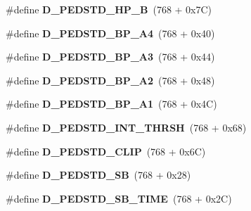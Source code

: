\begin{DoxyCompactItemize}
\item 
\#define {\bfseries D\+\_\+\+P\+E\+D\+S\+T\+D\+\_\+\+H\+P\+\_\+B}~(768 + 0x7\+C)\hypertarget{group___d_r_i_v_e_r_s_ga36c0d5ca76fbb5df31ec8ca0a26db835}{}\label{group___d_r_i_v_e_r_s_ga36c0d5ca76fbb5df31ec8ca0a26db835}

\item 
\#define {\bfseries D\+\_\+\+P\+E\+D\+S\+T\+D\+\_\+\+B\+P\+\_\+\+A4}~(768 + 0x40)\hypertarget{group___d_r_i_v_e_r_s_gac2bece455bcecb189a347b6c0edf2b6f}{}\label{group___d_r_i_v_e_r_s_gac2bece455bcecb189a347b6c0edf2b6f}

\item 
\#define {\bfseries D\+\_\+\+P\+E\+D\+S\+T\+D\+\_\+\+B\+P\+\_\+\+A3}~(768 + 0x44)\hypertarget{group___d_r_i_v_e_r_s_ga41557d8ab6be78f157aa4770d5123235}{}\label{group___d_r_i_v_e_r_s_ga41557d8ab6be78f157aa4770d5123235}

\item 
\#define {\bfseries D\+\_\+\+P\+E\+D\+S\+T\+D\+\_\+\+B\+P\+\_\+\+A2}~(768 + 0x48)\hypertarget{group___d_r_i_v_e_r_s_ga000da9f0c92ec1a103f8e1c50e7e61fd}{}\label{group___d_r_i_v_e_r_s_ga000da9f0c92ec1a103f8e1c50e7e61fd}

\item 
\#define {\bfseries D\+\_\+\+P\+E\+D\+S\+T\+D\+\_\+\+B\+P\+\_\+\+A1}~(768 + 0x4\+C)\hypertarget{group___d_r_i_v_e_r_s_ga6c42f0b2097fe55659dc5ec653681d50}{}\label{group___d_r_i_v_e_r_s_ga6c42f0b2097fe55659dc5ec653681d50}

\item 
\#define {\bfseries D\+\_\+\+P\+E\+D\+S\+T\+D\+\_\+\+I\+N\+T\+\_\+\+T\+H\+R\+SH}~(768 + 0x68)\hypertarget{group___d_r_i_v_e_r_s_ga35d9c5ca325de3055539cdae8e5b497c}{}\label{group___d_r_i_v_e_r_s_ga35d9c5ca325de3055539cdae8e5b497c}

\item 
\#define {\bfseries D\+\_\+\+P\+E\+D\+S\+T\+D\+\_\+\+C\+L\+IP}~(768 + 0x6\+C)\hypertarget{group___d_r_i_v_e_r_s_ga211abccbe885d02059206ca4da711b54}{}\label{group___d_r_i_v_e_r_s_ga211abccbe885d02059206ca4da711b54}

\item 
\#define {\bfseries D\+\_\+\+P\+E\+D\+S\+T\+D\+\_\+\+SB}~(768 + 0x28)\hypertarget{group___d_r_i_v_e_r_s_ga50a1a44c925cadaa77b3b88e08db7e08}{}\label{group___d_r_i_v_e_r_s_ga50a1a44c925cadaa77b3b88e08db7e08}

\item 
\#define {\bfseries D\+\_\+\+P\+E\+D\+S\+T\+D\+\_\+\+S\+B\+\_\+\+T\+I\+ME}~(768 + 0x2\+C)\hypertarget{group___d_r_i_v_e_r_s_ga0d3790675bcf0bbb837f2834523aca11}{}\label{group___d_r_i_v_e_r_s_ga0d3790675bcf0bbb837f2834523aca11}


\end{DoxyCompactItemize}
